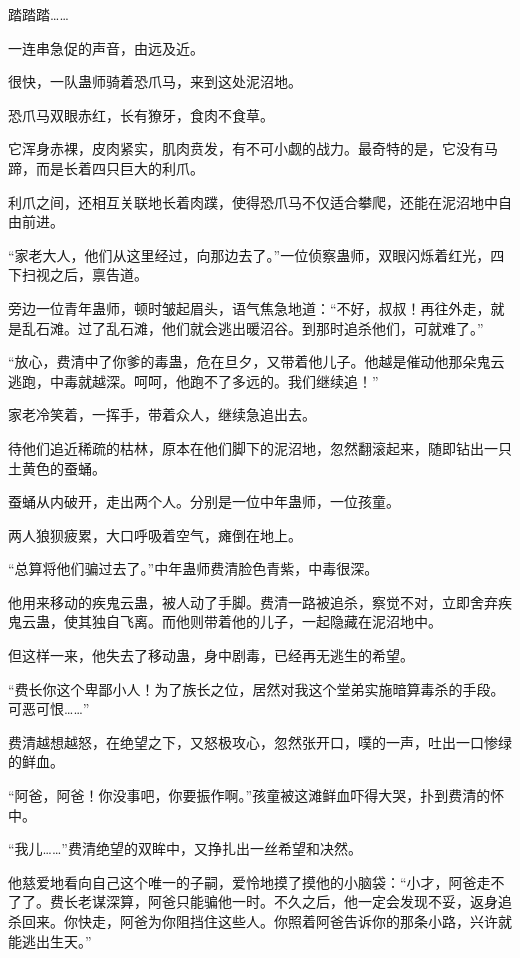 
\begin{this_body}

踏踏踏……

一连串急促的声音，由远及近。

很快，一队蛊师骑着恐爪马，来到这处泥沼地。

恐爪马双眼赤红，长有獠牙，食肉不食草。

它浑身赤裸，皮肉紧实，肌肉贲发，有不可小觑的战力。最奇特的是，它没有马蹄，而是长着四只巨大的利爪。

利爪之间，还相互关联地长着肉蹼，使得恐爪马不仅适合攀爬，还能在泥沼地中自由前进。

“家老大人，他们从这里经过，向那边去了。”一位侦察蛊师，双眼闪烁着红光，四下扫视之后，禀告道。

旁边一位青年蛊师，顿时皱起眉头，语气焦急地道：“不好，叔叔！再往外走，就是乱石滩。过了乱石滩，他们就会逃出暖沼谷。到那时追杀他们，可就难了。”

“放心，费清中了你爹的毒蛊，危在旦夕，又带着他儿子。他越是催动他那朵鬼云逃跑，中毒就越深。呵呵，他跑不了多远的。我们继续追！”

家老冷笑着，一挥手，带着众人，继续急追出去。

待他们追近稀疏的枯林，原本在他们脚下的泥沼地，忽然翻滚起来，随即钻出一只土黄色的蚕蛹。

蚕蛹从内破开，走出两个人。分别是一位中年蛊师，一位孩童。

两人狼狈疲累，大口呼吸着空气，瘫倒在地上。

“总算将他们骗过去了。”中年蛊师费清脸色青紫，中毒很深。

他用来移动的疾鬼云蛊，被人动了手脚。费清一路被追杀，察觉不对，立即舍弃疾鬼云蛊，使其独自飞离。而他则带着他的儿子，一起隐藏在泥沼地中。

但这样一来，他失去了移动蛊，身中剧毒，已经再无逃生的希望。

“费长你这个卑鄙小人！为了族长之位，居然对我这个堂弟实施暗算毒杀的手段。可恶可恨……”

费清越想越怒，在绝望之下，又怒极攻心，忽然张开口，噗的一声，吐出一口惨绿的鲜血。

“阿爸，阿爸！你没事吧，你要振作啊。”孩童被这滩鲜血吓得大哭，扑到费清的怀中。

“我儿……”费清绝望的双眸中，又挣扎出一丝希望和决然。

他慈爱地看向自己这个唯一的子嗣，爱怜地摸了摸他的小脑袋：“小才，阿爸走不了了。费长老谋深算，阿爸只能骗他一时。不久之后，他一定会发现不妥，返身追杀回来。你快走，阿爸为你阻挡住这些人。你照着阿爸告诉你的那条小路，兴许就能逃出生天。”


\end{this_body}
